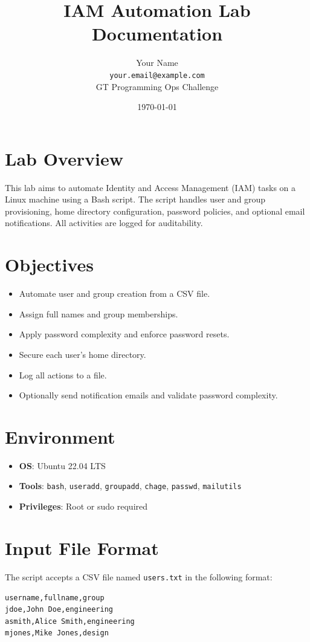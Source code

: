 \documentclass[a4paper,11pt]{article}
\title{\textbf{IAM Automation Lab Documentation}}
\author{Your Name \\ \texttt{your.email@example.com} \\ GT Programming Ops Challenge}
\date{\today}
\begin{document}
\maketitle

\section*{Lab Overview}
This lab aims to automate Identity and Access Management (IAM) tasks on a Linux machine using a Bash script. The script handles user and group provisioning, home directory configuration, password policies, and optional email notifications. All activities are logged for auditability.

\section*{Objectives}
\begin{itemize}
  \item Automate user and group creation from a CSV file.
  \item Assign full names and group memberships.
  \item Apply password complexity and enforce password resets.
  \item Secure each user's home directory.
  \item Log all actions to a file.
  \item Optionally send notification emails and validate password complexity.
\end{itemize}

\section*{Environment}
\begin{itemize}
  \item \textbf{OS}: Ubuntu 22.04 LTS
  \item \textbf{Tools}: \texttt{bash}, \texttt{useradd}, \texttt{groupadd}, \texttt{chage}, \texttt{passwd}, \texttt{mailutils}
  \item \textbf{Privileges}: Root or sudo required
\end{itemize}

\section*{Input File Format}
The script accepts a CSV file named \texttt{users.txt} in the following format:
\begin{lstlisting}
username,fullname,group
jdoe,John Doe,engineering
asmith,Alice Smith,engineering
mjones,Mike Jones,design
\end{lstlisting}
\end{document}
